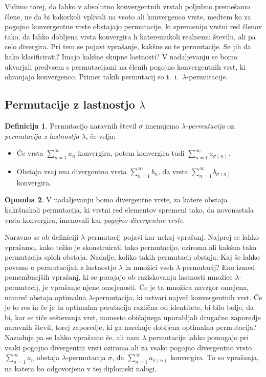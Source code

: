 \documentclass[12pt,a4paper,reqno]{amsart}
\theoremstyle{definition} %
\newtheorem{definicija}{Definicija}[section]
\newtheorem{opomba}[definicija]{Opomba}
\theoremstyle{plain} %
\begin{document}
Vidimo torej, da lahko v absolutno konvergentnih vrstah poljubno premešamo člene, ne da bi kakorkoli vplivali na vsoto ali konvergenco vrste, medtem ko za pogojno konvergentne vrste obstajajo permutacije, ki spremenijo vrstni red členov tako, da lahko dobljena vrsta konvergira h kateremukoli realnemu številu, ali pa celo divergira. Pri tem se pojavi vprašanje, kakšne so te permutacije. Se jih da kako klasificirati? Imajo kakšne skupne lastnosti? V nadaljevanju se bomo ukvarjali predvsem s permutacijami na členih pogojno konvergentnih vrst, ki ohranjajo konvergenco. Primer takih permutacij so t.~i.\ $\lambda$-permutacije.

\subsection{Permutacije z lastnostjo $\lambda$}

\begin{definicija}
Permutacijo naravnih števil $\sigma$ imenujemo \emph{$\lambda$-permutacija} oz. \emph{permutacija z lastnostjo $\lambda$}, če velja:
\begin{itemize}
\item[(1)] Če vrsta $\displaystyle\sum^{\infty}_{n=1}a_n$ konvergira, potem konvergira tudi $\displaystyle\sum^{\infty}_{n=1}a_{\sigma (n)}.$
\item[(2)] Obstaja vsaj ena divergentna vrsta $\displaystyle\sum^{\infty}_{n=1}b_n$, da vrsta $\displaystyle\sum^{\infty}_{n=1}b_{\sigma (n)}$ konvergira.
\end{itemize}
\end{definicija}

\begin{opomba}
V nadaljevanju bomo divergentne vrste, za katere obstaja kakršnakoli permutacija, ki vrstni red elementov spremeni tako, da novonastala vrsta konvergira, imenovali kar \emph{pogojno divergentne vrste}.
\end{opomba}

Naravno se ob definiciji $\lambda$-permutacij pojavi kar nekaj vprašanj. Najprej se lahko vprašamo, kako težko je skonstruirati tako permutacijo, oziroma ali kakšna taka permutacija sploh obstaja. Nadalje, koliko takih permutacij obstaja. Kaj še lahko povemo o permutacijah z lastnostjo $\lambda$ in množici vseh $\lambda$-permutacij? Eno izmed pomembnejših vprašanj, ki se porajajo ob raziskovanju lastnosti množice $\lambda$-permutacij, je vprašanje njene omejenosti. Če je ta množica navzgor omejena, namreč obstaja optimalna $\lambda$-permutacija, ki ustvari največ konvergentnih vrst. Če je to res in če je ta optimalna perutacija različna od identitete, bi bilo bolje, da bi, kar se tiče seštevanja vrst, namesto običajnega uporabljali drugačno zaporedje naravnih števil, torej zaporedje, ki ga narekuje dobljena optimalna permutacija? Nazadnje pa se lahko vprašamo še, ali nam $\lambda$ permutacije lahko pomagajo pri vsaki pogojno divergentni vrsti oziroma ali za vsako pogojno divergentno vrsto $\sum^{\infty}_{n=1}a_n$ obstaja $\lambda$-permutacija $\sigma$, da $\sum^{\infty}_{n=1}a_{\sigma (n)}$ konvergira. To so vprašanja, na katera bo odgovorjeno v tej diplomski nalogi.
\end{document}

